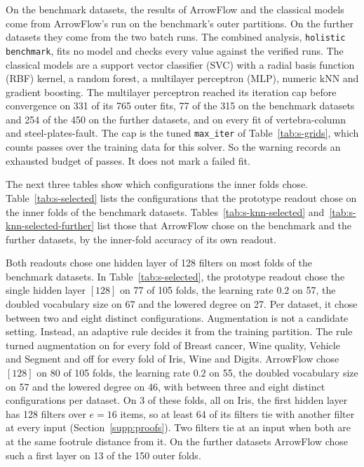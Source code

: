 On the benchmark datasets, the results of ArrowFlow and the classical models come from ArrowFlow's run on the benchmark's outer partitions. On the further datasets they come from the two batch runs. The combined analysis, \texttt{holistic benchmark}, fits no model and checks every value against the verified runs. The classical models are a support vector classifier (SVC) with a radial basis function (RBF) kernel, a random forest, a multilayer perceptron (MLP), numeric kNN and gradient boosting. The multilayer perceptron reached its iteration cap before convergence on 331 of its 765 outer fits, 77 of the 315 on the benchmark datasets and 254 of the 450 on the further datasets, and on every fit of vertebra-column and steel-plates-fault. The cap is the tuned \texttt{max\_iter} of Table~\ref{tab:s-grids}, which counts passes over the training data for this solver. So the warning records an exhausted budget of passes. It does not mark a failed fit.





The next three tables show which configurations the inner folds chose. Table~\ref{tab:s-selected} lists the configurations that the prototype readout chose on the inner folds of the benchmark datasets. Tables~\ref{tab:s-knn-selected} and~\ref{tab:s-knn-selected-further} list those that ArrowFlow chose on the benchmark and the further datasets, by the inner-fold accuracy of its own readout.





Both readouts chose one hidden layer of 128 filters on most folds of the benchmark datasets. In Table~\ref{tab:s-selected}, the prototype readout chose the single hidden layer $[128]$ on 77 of 105 folds, the learning rate $0.2$ on 57, the doubled vocabulary size on 67 and the lowered degree on 27. Per dataset, it chose between two and eight distinct configurations. Augmentation is not a candidate setting. Instead, an adaptive rule decides it from the training partition. The rule turned augmentation on for every fold of Breast cancer, Wine quality, Vehicle and Segment and off for every fold of Iris, Wine and Digits. ArrowFlow chose $[128]$ on 80 of 105 folds, the learning rate $0.2$ on 55, the doubled vocabulary size on 57 and the lowered degree on 46, with between three and eight distinct configurations per dataset. On 3 of these folds, all on Iris, the first hidden layer has 128 filters over $e=16$ items, so at least 64 of its filters tie with another filter at every input (Section~\ref{supp:proofs}). Two filters tie at an input when both are at the same footrule distance from it. On the further datasets ArrowFlow chose such a first layer on 13 of the 150 outer folds.

